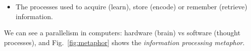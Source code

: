 \begin{itemize}
    \item The processes used to acquire (learn), store (encode) or remember (retrieve) information.
\end{itemize}
We can see a parallelism in computers: hardware (brain) vs software (thought processes), and Fig.~\ref{fig:metaphor} shows the\textit{ information processing 
metaphor}.
